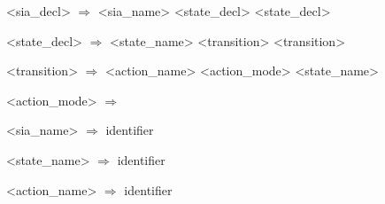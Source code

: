 \setlength{\grammarindent}{10em} %
\begin{grammar}
    <sia\_decl> $\Rightarrow$  <sia\_name> \lit{\{} <state\_decl> \Regex{[} <state\_decl> \Regex{]*} \lit{\}}

    <state\_decl> $\Rightarrow$ <state\_name> \lit{:} <transition> \Regex{[} \lit{|} <transition> \Regex{]*}

    <transition> $\Rightarrow$ <action\_name> <action\_mode>  <state\_name>

    <action\_mode> $\Rightarrow$  \alt \lit{!} \alt \lit{;}

    <sia\_name> $\Rightarrow$ identifier

    <state\_name> $\Rightarrow$ identifier

    <action\_name> $\Rightarrow$ identifier
\end{grammar}

